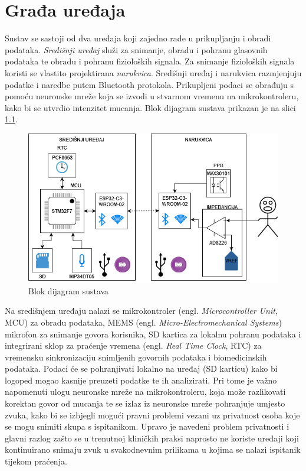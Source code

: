 \chapter{Građa uređaja}
\label{pog:structure}

Sustav se sastoji od dva uređaja koji zajedno rade u prikupljanju i obradi podataka. \textit{Središnji uređaj} služi za snimanje, obradu i pohranu glasovnih podataka te obradu i pohranu fizioloških signala. Za snimanje fizioloških signala koristi se vlastito projektirana \textit{narukvica}. Središnji uređaj i narukvica razmjenjuju podatke i naredbe putem Bluetooth protokola. Prikupljeni podaci se obrađuju s pomoću neuronske mreže koja se izvodi u stvarnom vremenu na mikrokontroleru, kako bi se utvrdio intenzitet mucanja. Blok dijagram sustava prikazan je na slici \ref{slk:BD_MAIN}.
\begin{figure}[htb]
    \centering
    \includegraphics[width=\textwidth]{Figures/block_diagram.drawio.png}
    \caption{Blok dijagram sustava}
    \label{slk:BD_MAIN}
\end{figure}

Na središnjem uređaju nalazi se mikrokontroler (engl. \textit{Microcontroller Unit}, MCU) za obradu podataka, MEMS (engl. \textit{Micro-Electromechanical Systems}) mikrofon za snimanje govora korisnika, SD kartica za lokalnu pohranu podataka i integrirani sklop za praćenje vremena (engl. \textit{Real Time Clock}, RTC) za vremensku sinkronizaciju snimljenih govornih podataka i biomedicinskih podataka. Podaci će se pohranjivati lokalno na uređaj (SD karticu) kako bi logoped mogao kasnije preuzeti podatke te ih analizirati. Pri tome je važno napomenuti ulogu neuronske mreže na mikrokontroleru, koja može razlikovati korektan govor od mucanja te se izlaz iz neuronske mreže pohranjuje umjesto zvuka, kako bi se izbjegli mogući pravni problemi vezani uz privatnost osoba koje se mogu snimiti skupa s ispitanikom. Upravo je navedeni problem privatnosti i glavni razlog zašto se u trenutnoj kliničkih praksi naprosto ne koriste uređaji koji kontinuirano snimaju zvuk u svakodnevnim prilikama u kojima se nalazi ispitanik tijekom praćenja.

